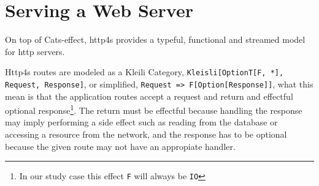 \documentclass[../main.tex]{subfiles}
\begin{document}
\section{Serving a Web Server}
On top of Cats-effect, http4s provides a typeful, functional and streamed model
for http servers.

Http4s routes are modeled as a Kleili Category, \mbox{\texttt{Kleisli[OptionT[F,
*], Request, Response]}}, or simplified, \mbox{\texttt{Request => F[Option[Response]]}},
what this mean is that the application routes accept a request and return and
effectful optional response\footnote{In our study case this effect \texttt{F}
  will always be \texttt{IO}}. The return must be effectful because handling the
response may imply performing a side effect such as reading from the database or
accessing a resource from the network, and the response has to be optional
because the given route may not have an appropiate handler.
\end{document}
